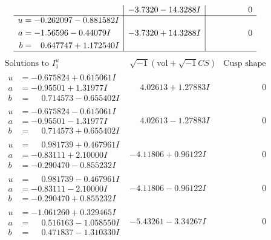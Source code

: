 \documentclass[1p]{elsarticle_modified}
\theoremstyle{definition}
\newcommand{\I}{\sqrt{-1}}
\begin{document}
$$\begin{array}{c|c|c}
 & -3.7320 - 14.3288 I & \phantom{-0.000000 } 0 \\ \hline\begin{aligned}
u &= -0.262097 - 0.881582 I \\
a &= -1.56596 - 0.44079 I \\
b &= \phantom{-}0.647747 + 1.172540 I\end{aligned}
 & -3.7320 + 14.3288 I & \phantom{-0.000000 } 0\\
 \hline 
 \end{array}$$\newpage$$\begin{array}{c|c|c}  
\text{Solutions to }I^u_{1}& \I (\text{vol} + \sqrt{-1}CS) & \text{Cusp shape}\\
 \hline 
\begin{aligned}
u &= -0.675824 + 0.615061 I \\
a &= -0.95501 + 1.31977 I \\
b &= \phantom{-}0.714573 - 0.655402 I\end{aligned}
 & \phantom{-}4.02613 + 1.27883 I & \phantom{-0.000000 } 0 \\ \hline\begin{aligned}
u &= -0.675824 - 0.615061 I \\
a &= -0.95501 - 1.31977 I \\
b &= \phantom{-}0.714573 + 0.655402 I\end{aligned}
 & \phantom{-}4.02613 - 1.27883 I & \phantom{-0.000000 } 0 \\ \hline\begin{aligned}
u &= \phantom{-}0.981739 + 0.467961 I \\
a &= -0.83111 + 2.10000 I \\
b &= -0.290470 - 0.855232 I\end{aligned}
 & -4.11806 + 0.96122 I & \phantom{-0.000000 } 0 \\ \hline\begin{aligned}
u &= \phantom{-}0.981739 - 0.467961 I \\
a &= -0.83111 - 2.10000 I \\
b &= -0.290470 + 0.855232 I\end{aligned}
 & -4.11806 - 0.96122 I & \phantom{-0.000000 } 0 \\ \hline\begin{aligned}
u &= -1.061260 + 0.329465 I \\
a &= \phantom{-}0.516163 - 1.058550 I \\
b &= \phantom{-}0.471837 - 1.310330 I\end{aligned}
 & -5.43261 - 3.34267 I & \phantom{-0.000000 } 0 \\ \hline\begin{aligned}

\end{aligned}
\end{array}$$
\end{document}
